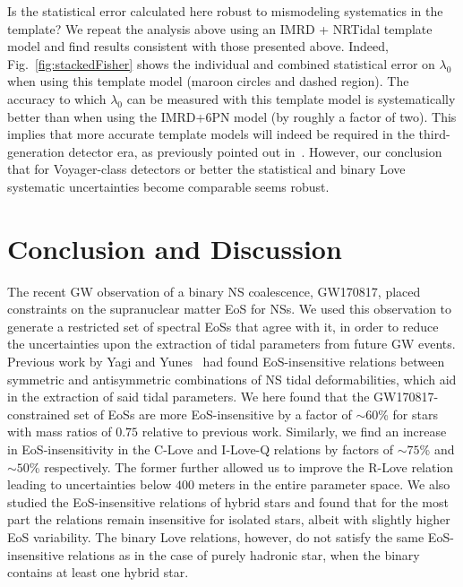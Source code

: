 \documentclass[prd,twocolumn,nofootinbib,superscriptaddress,amsmath,amssymb]{revtex4-1}
\begin{document}
Is the statistical error calculated here robust to mismodeling systematics in the template? We repeat the analysis above using an IMRD + NRTidal template model  and find results consistent with those presented above. Indeed, Fig.~\ref{fig:stackedFisher} shows the individual and combined statistical error on $\lambda_{0}$ when using this template model (maroon circles and dashed region). The accuracy to which $\lambda_{0}$ can be measured with this template model is systematically better than when using the IMRD+6PN model (by roughly a factor of two). This implies that more accurate template models will indeed be required in the third-generation detector era, as previously pointed out in~\cite{Samajdar:NRTidal}. However, our conclusion that for Voyager-class detectors or better the statistical and binary Love systematic uncertainties become comparable seems robust.   


\section{Conclusion and Discussion}
\label{sec:conclusion}

The recent GW observation of a binary NS coalescence, GW170817, placed constraints on the supranuclear matter EoS for NSs. We used this observation to generate a restricted set of spectral EoSs that agree with it, in order to reduce the uncertainties upon the extraction of tidal parameters from future GW events. Previous work by Yagi and Yunes~\cite{Yagi:2013bca,Yagi:ILQ,Yagi:2015pkc,Yagi:binLove} had found EoS-insensitive relations between symmetric and antisymmetric combinations of NS tidal deformabilities, which aid in the extraction of said tidal parameters. We here found that the GW170817-constrained set of EoSs are more EoS-insensitive by a factor of $\sim 60$\% for stars with mass ratios of $0.75$ relative to previous work. Similarly, we find an increase in EoS-insensitivity in the C-Love and I-Love-Q  relations by factors of $\sim 75$\% and $\sim 50$\% respectively. The former further allowed us to improve the R-Love relation leading to uncertainties below $400$ meters in the entire parameter space. We also studied the EoS-insensitive relations of hybrid stars and found that for the most part the relations remain insensitive for isolated stars, albeit with slightly higher EoS variability. The binary Love relations, however, do not satisfy the same EoS-insensitive relations as in the case of purely hadronic star, when the binary contains at least one hybrid star. 
\end{document}
